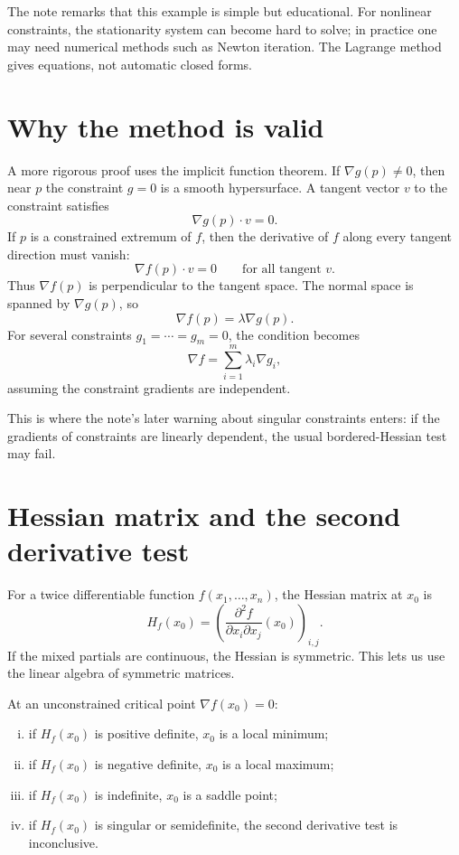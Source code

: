 The note remarks that this example is simple but educational.  For nonlinear constraints, the stationarity system can become hard to solve; in practice one may need numerical methods such as Newton iteration.  The Lagrange method gives equations, not automatic closed forms.

\section{Why the method is valid}

A more rigorous proof uses the implicit function theorem.  If $\nabla g(p)\ne0$, then near $p$ the constraint $g=0$ is a smooth hypersurface.  A tangent vector $v$ to the constraint satisfies
\[
  \nabla g(p)\cdot v=0.
\]
If $p$ is a constrained extremum of $f$, then the derivative of $f$ along every tangent direction must vanish:
\[
  \nabla f(p)\cdot v=0
  \qquad \text{for all tangent }v.
\]
Thus $\nabla f(p)$ is perpendicular to the tangent space.  The normal space is spanned by $\nabla g(p)$, so
\[
  \nabla f(p)=\lambda \nabla g(p).
\]
For several constraints $g_1=\cdots=g_m=0$, the condition becomes
\[
  \nabla f=\sum_{i=1}^m \lambda_i \nabla g_i,
\]
assuming the constraint gradients are independent.

This is where the note's later warning about singular constraints enters: if the gradients of constraints are linearly dependent, the usual bordered-Hessian test may fail.

\section{Hessian matrix and the second derivative test}

For a twice differentiable function $f(x_1,\ldots,x_n)$, the Hessian matrix at $x_0$ is
\[
  H_f(x_0)=\left(\frac{\partial^2 f}{\partial x_i\partial x_j}(x_0)\right)_{i,j}.
\]
If the mixed partials are continuous, the Hessian is symmetric.  This lets us use the linear algebra of symmetric matrices.

At an unconstrained critical point $\nabla f(x_0)=0$:
\begin{enumerate}[(i)]
  \item if $H_f(x_0)$ is positive definite, $x_0$ is a local minimum;
  \item if $H_f(x_0)$ is negative definite, $x_0$ is a local maximum;
  \item if $H_f(x_0)$ is indefinite, $x_0$ is a saddle point;
  \item if $H_f(x_0)$ is singular or semidefinite, the second derivative test is inconclusive.
\end{enumerate}

